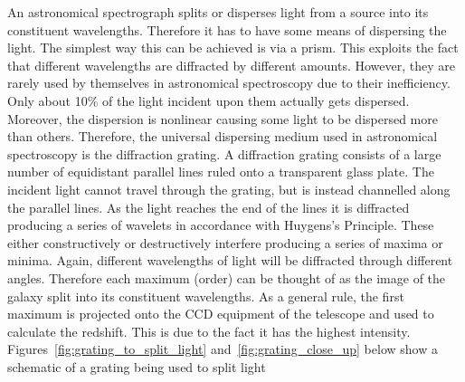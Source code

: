 	An astronomical spectrograph splits or disperses light from a source into its constituent wavelengths. Therefore it has to have some means of dispersing the light. The simplest way this can be achieved is via a prism. This exploits the fact that different wavelengths are diffracted by different amounts. However, they are rarely used by themselves in astronomical spectroscopy due to their inefficiency. Only about 10\% of the light incident upon them actually gets dispersed. Moreover, the dispersion is nonlinear causing some light to be dispersed more than others. Therefore, the universal dispersing medium used in astronomical spectroscopy is the diffraction grating. A diffraction grating consists of a large number of equidistant parallel lines ruled onto a transparent glass plate. The incident light cannot travel through the grating, but is instead channelled along the parallel lines. As the light reaches the end of the lines it is diffracted producing a series of wavelets in accordance with Huygens's Principle. These either constructively or destructively interfere producing a series of maxima or minima. Again, different wavelengths of light will be diffracted through different angles. Therefore each maximum (order) can be thought of as the image of the galaxy split into its constituent wavelengths. As a general rule, the first maximum is projected onto the CCD equipment of the telescope and used to calculate the redshift. This is due to the fact it has the highest intensity. Figures~\ref{fig:grating_to_split_light} and~\ref{fig:grating_close_up} below show a schematic of a grating being used to split light
